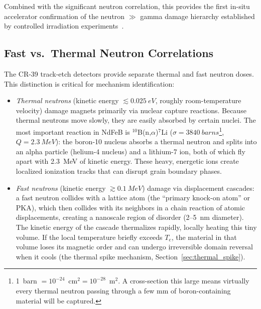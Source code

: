 \documentclass[11pt,letterpaper]{article}
\newcommand{\Tc}{T_\mathrm{c}}
\begin{document}
Combined with the significant neutron correlation, this provides the
first in-situ accelerator confirmation of the neutron $\gg$ gamma
damage hierarchy established by controlled irradiation
experiments~\cite{Samin2018,Alderman,Miyahara,APSLS290}.

\subsection{Fast vs.\ Thermal Neutron Correlations}
\label{sec:fast_thermal}

The CR-39 track-etch detectors provide separate thermal and fast neutron
doses. This distinction is critical for mechanism identification:
\begin{itemize}
    \item \emph{Thermal neutrons} (kinetic energy $\lesssim \SI{0.025}{eV}$,
    roughly room-temperature velocity) damage magnets primarily via nuclear
    capture reactions. Because thermal neutrons move slowly, they are easily
    absorbed by certain nuclei. The most important reaction in NdFeB is
    ${}^{10}$B(n,$\alpha$)${}^{7}$Li ($\sigma =
    \SI{3840}{barns}$\footnote{1~barn $= 10^{-24}$~cm$^2 = 10^{-28}$~m$^2$. A
    cross-section this large means virtually every thermal neutron passing
    through a few mm of boron-containing material will be captured.},
    $Q = \SI{2.3}{MeV}$): the boron-10 nucleus absorbs a thermal neutron and
    splits into an alpha particle (helium-4 nucleus) and a lithium-7 ion, both
    of which fly apart with \SI{2.3}{MeV} of kinetic energy. These heavy,
    energetic ions create localized ionization tracks that can disrupt grain
    boundary phases.
    \item \emph{Fast neutrons} (kinetic energy $\gtrsim \SI{0.1}{MeV}$)
    damage via displacement cascades: a fast neutron collides with a lattice
    atom (the ``primary knock-on atom'' or PKA), which then collides with its
    neighbors in a chain reaction of atomic displacements, creating a nanoscale
    region of disorder (2--\SI{5}{nm} diameter). The kinetic energy of the
    cascade thermalizes rapidly, locally heating this tiny volume. If the local
    temperature briefly exceeds $\Tc$, the material in that volume loses its
    magnetic order and can undergo irreversible domain reversal when it cools
    (the thermal spike mechanism, Section~\ref{sec:thermal_spike}).
\end{itemize}
\end{document}
